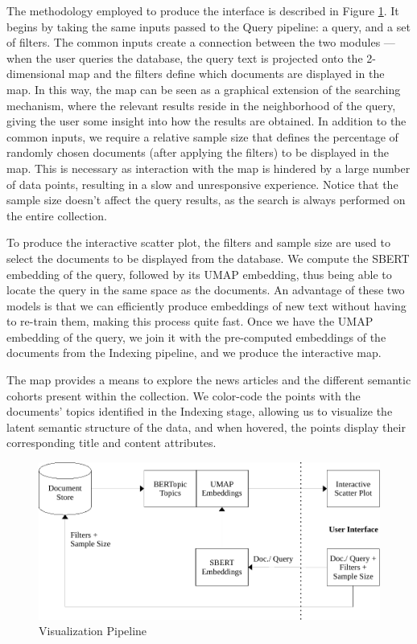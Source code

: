 \documentclass[a4paper]{article}
\begin{document}
The methodology employed to produce the interface is described in Figure \ref{vis_pipeline}. It begins by taking the same inputs passed to the Query pipeline: a query, and a set of filters. The common inputs create a connection between the two modules — when the user queries the database, the query text is projected onto the 2-dimensional map and the filters define which documents are displayed in the map. In this way, the map can be seen as a graphical extension of the searching mechanism, where the relevant results reside in the neighborhood of the query, giving the user some insight into how the results are obtained. In addition to the common inputs, we require a relative sample size that defines the percentage of randomly chosen documents (after applying the filters) to be displayed in the map. This is necessary as interaction with the map is hindered by a large number of data points, resulting in a slow and unresponsive experience. Notice that the sample size doesn't affect the query results, as the search is always performed on the entire collection.

To produce the interactive scatter plot, the filters and sample size are used to select the documents to be displayed from the database. We compute the SBERT embedding of the query, followed by its UMAP embedding, thus being able to locate the query in the same space as the documents. An advantage of these two models is that we can efficiently produce embeddings of new text without having to re-train them, making this process quite fast. Once we have the UMAP embedding of the query, we join it with the pre-computed embeddings of the documents from the Indexing pipeline, and we produce the interactive map.

The map provides a means to explore the news articles and the different semantic cohorts present within the collection. We color-code the points with the documents' topics identified in the Indexing stage, allowing us to visualize the latent semantic structure of the data, and when hovered, the points display their corresponding title and content attributes.

\begin{figure}[H]
	\centering
	\includegraphics[scale=0.7]{./assets/vis_pipeline}
	\caption{Visualization Pipeline}
	\label{vis_pipeline}
\end{figure}
\end{document}
